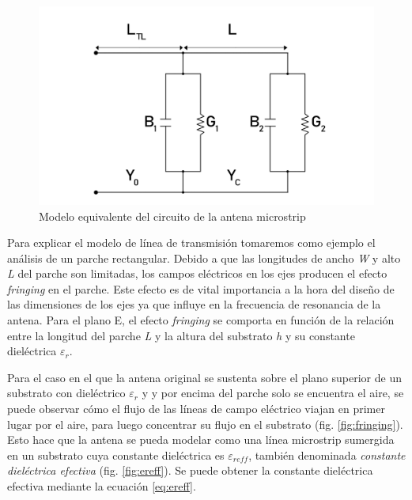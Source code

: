 \begin{figure}[h]
    \centering
        \includegraphics[width=12cm]{archivos/parche/circuito}
        \caption{Modelo equivalente del circuito de la antena microstrip}
        \label{fig:modelo}
\end{figure}

\par Para explicar el modelo de línea de transmisión tomaremos como ejemplo el análisis de un parche rectangular. Debido a que las longitudes de ancho \textit{W} y alto \textit{L} del parche son limitadas, los campos eléctricos en los ejes producen el efecto \textit{fringing} en el parche. Este efecto es de vital importancia a la hora del diseño de las dimensiones de los ejes ya que influye en la frecuencia de resonancia de la antena. Para el plano E, el efecto \textit{fringing} se comporta en función de la relación entre la longitud del parche \textit{L} y la altura del substrato \textit{h} y su constante dieléctrica \textit{$\varepsilon_{r}$}. 
\\
\par  Para el caso en el que la antena original se sustenta sobre el plano superior de un substrato con dieléctrico \textit{$\varepsilon_{r}$} y y por encima del parche solo se encuentra el aire, se puede observar cómo el flujo de las líneas de campo eléctrico viajan en primer lugar por el aire, para luego concentrar su flujo en el substrato (fig. \ref{fig:fringing}). Esto hace que la antena se pueda modelar como una línea microstrip sumergida en un substrato cuya constante dieléctrica es $\varepsilon_{reff}$, también denominada \textit{constante dieléctrica efectiva} (fig. \ref{fig:ereff}). Se puede obtener la constante dieléctrica efectiva mediante la ecuación \ref{eq:ereff}.


